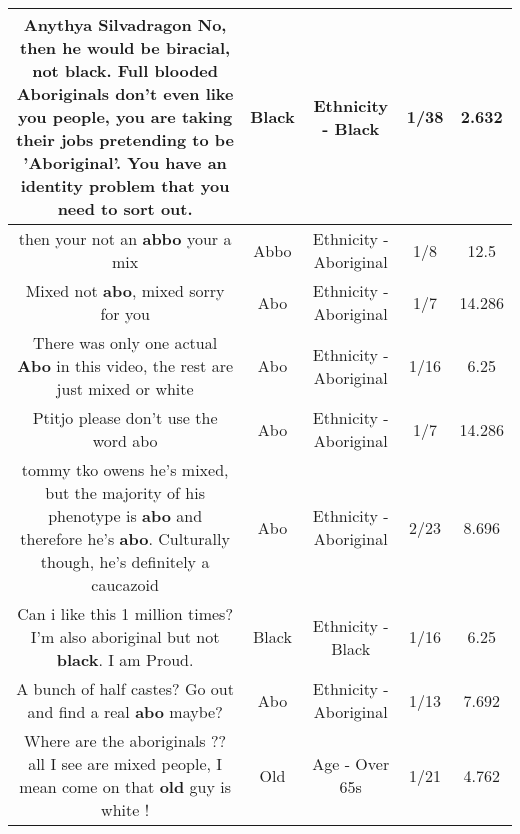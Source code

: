 \documentclass[11pt]{article}
\newlength\mylength
\begin{document}
\begin{center}
\begin{longtable}{|C{.65\mylength}|C{.30\mylength}|C{.12\mylength}|C{.12\mylength}|C{.12\mylength}|}
  \small Anythya Silvadragon No, then he would be biracial, not \textbf{black}. Full blooded Aboriginals don't even like you people, you are taking their jobs pretending to be 'Aboriginal'. You have an identity problem that you need to sort out.\normalsize   & Black & Ethnicity - Black & 1/38 & 2.632 \\  \hline
  \small then your not an \textbf{abbo} your a mix\normalsize   & Abbo & Ethnicity - Aboriginal & 1/8 & 12.5 \\  \hline
  \small Mixed not \textbf{abo}, mixed sorry for you\normalsize   & Abo & Ethnicity - Aboriginal & 1/7 & 14.286 \\  \hline
  \small There was only one actual \textbf{Abo} in this video, the rest are just mixed or white\normalsize   & Abo & Ethnicity - Aboriginal & 1/16 & 6.25 \\  \hline
  \small Ptitjo please don't use the word abo\normalsize   & Abo & Ethnicity - Aboriginal & 1/7 & 14.286 \\  \hline
  \small tommy tko owens he's mixed, but the majority of his phenotype is \textbf{abo} and therefore he's \textbf{abo}. Culturally though, he's definitely a caucazoid\normalsize   & Abo & Ethnicity - Aboriginal & 2/23 & 8.696 \\  \hline
  \small Can i like this 1 million times? I'm also aboriginal but not \textbf{black}. I am Proud.\normalsize   & Black & Ethnicity - Black & 1/16 & 6.25 \\  \hline
  \small A bunch of half castes? Go out and find a real \textbf{abo} maybe?\normalsize   & Abo & Ethnicity - Aboriginal & 1/13 & 7.692 \\  \hline
  \small Where are the aboriginals ?? all I see are mixed people, I mean come on that \textbf{old} guy is white !\normalsize   & Old & Age - Over 65s & 1/21 & 4.762 \\  \hline

\end{longtable}
\end{center}
\end{document}

